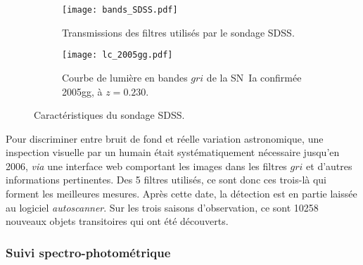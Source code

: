 \documentclass[../main/main.tex]{subfiles}
\begin{document}
\begin{figure}[h]
    \centering
    \begin{subfigure}[]{.49\linewidth}
        \centering
        \texttt{[image: bands\_SDSS.pdf]}
        \captionsetup{justification=centering}
        \caption{Transmissions des filtres utilisés par le sondage SDSS.}
        \label{fig:sdssbands}
    \end{subfigure}
    \begin{subfigure}[]{.49\linewidth}
        \centering
        \texttt{[image: lc\_2005gg.pdf]}
        \captionsetup{justification=centering}
        \caption{Courbe de lumière en bandes $gri$ de la SN~Ia
            confirmée 2005gg, à $z = 0.230$.}
        \label{fig:sdsslc}
    \end{subfigure}
    \caption{Caractéristiques du sondage SDSS.}
\end{figure}

% 

Pour discriminer entre bruit de fond et réelle variation astronomique, une
inspection visuelle par un humain était systématiquement nécessaire jusqu'en
2006, \textit{via} une interface web comportant les images dans les filtres
$gri$ et d'autres informations pertinentes. Des 5 filtres utilisés, ce sont donc
ces trois-là qui forment les meilleures mesures. Après cette date, la détection
est en partie laissée au logiciel \textit{autoscanner}. Sur les trois saisons
d'observation, ce sont 10258 nouveaux objets transitoires qui ont été
découverts.

\subsubsection{Suivi spectro-photométrique}\label{sssec:sdssspectro}
\end{document}
